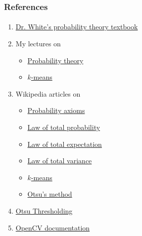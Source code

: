 \documentclass{beamer}                             %
\begin{document}
\begin{frame}
\frametitle{References}
\framesubtitle{}
\begin{enumerate}
  \item \href{https://github.com/pwhitetj/probtheory}
    {Dr. White's probability theory textbook}
  \item My lectures on
    \begin{itemize}
      \item \href{https://stephen-huan.github.io/assets/pdfs/cs-lectures/math/probability-theory/gacha-optimization/writeup.pdf\#page=4}
        {Probability theory}
      \item \href{https://stephen-huan.github.io/assets/pdfs/cs-lectures/computer-vision/kmeans-kd-tree/handout.pdf}
        {\( k \)-means}
    \end{itemize}
  \item Wikipedia articles on 
    \begin{itemize}
      \item \href{https://en.wikipedia.org/wiki/Probability_axioms}
        {Probability axioms}
      \item \href{https://en.wikipedia.org/wiki/Law_of_total_probability}
        {Law of total probability}
      \item \href{https://en.wikipedia.org/wiki/Law_of_total_expectation}
        {Law of total expectation}
      \item \href{https://en.wikipedia.org/wiki/Law_of_total_variance}
        {Law of total variance}
      \item \href{https://en.wikipedia.org/wiki/K-means_clustering}
        {\( k \)-means}
      \item \href{https://en.wikipedia.org/wiki/Otsu\%27s_method}
        {Otsu's method}
    \end{itemize}
  \item \href{http://www.labbookpages.co.uk/software/imgProc/otsuThreshold.html}
    {Otsu Thresholding}
  \item \href{https://docs.opencv.org/master/d7/d4d/tutorial_py_thresholding.html}
    {OpenCV documentation}
\end{enumerate}
\end{frame}

\end{document}
